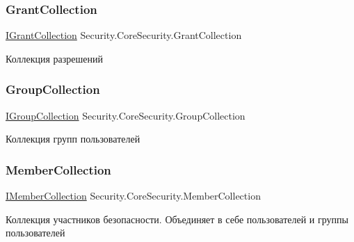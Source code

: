 \subsubsection{\texorpdfstring{Grant\+Collection}{GrantCollection}}
{\footnotesize\ttfamily \hyperlink{interface_security_1_1_interfaces_1_1_collections_1_1_i_grant_collection}{I\+Grant\+Collection} Security.\+Core\+Security.\+Grant\+Collection\hspace{0.3cm}{\ttfamily [get]}}



Коллекция разрешений 

\mbox{\label{class_security_1_1_core_security_ada9f6b2ac17bc46c621bb9acf01aa3ab}} 
\subsubsection{\texorpdfstring{Group\+Collection}{GroupCollection}}
{\footnotesize\ttfamily \hyperlink{interface_security_1_1_interfaces_1_1_collections_1_1_i_group_collection}{I\+Group\+Collection} Security.\+Core\+Security.\+Group\+Collection\hspace{0.3cm}{\ttfamily [get]}}



Коллекция групп пользователей 

\mbox{\label{class_security_1_1_core_security_a12a91cfb7b27f3a9fe1d25f7fdebc423}} 
\subsubsection{\texorpdfstring{Member\+Collection}{MemberCollection}}
{\footnotesize\ttfamily \hyperlink{interface_security_1_1_interfaces_1_1_collections_1_1_i_member_collection}{I\+Member\+Collection} Security.\+Core\+Security.\+Member\+Collection\hspace{0.3cm}{\ttfamily [get]}}



Коллекция участников безопасности. Объединяет в себе пользователей и группы пользователей 

